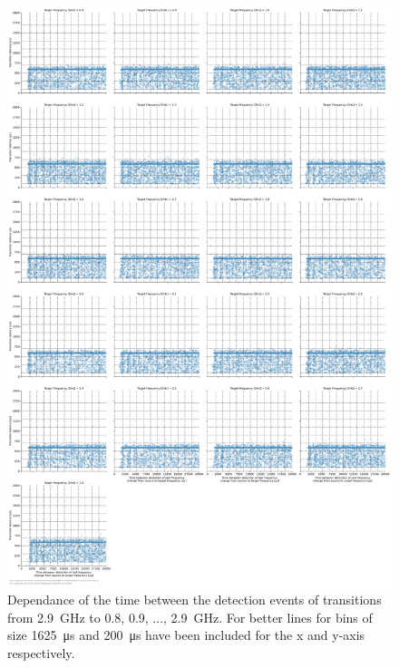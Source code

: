 \begin{figure}[]
    \centering
    \includegraphics[width=\columnwidth]{fig/ftalat/ftalat_scatter_wait_transition_latency_hati_source_2.9.pdf}
    \caption{Dependance of the time between the detection events of transitions from \SI{2.9}{\GHz} to \SI{0.8}{}, \SI{0.9}{}, ..., \SI{2.9}{\GHz}. For better lines for bins of size \SI{1625}{\us} and \SI{200}{\us} have been included for the x and y-axis respectively.}
\end{figure}